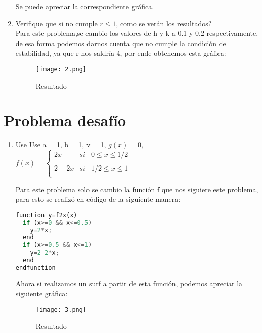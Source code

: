 \documentclass{article}
\begin{document}
\begin{flushleft}
\begin{enumerate}
Se puede apreciar la correspondiente gráfica.

\newpage
\item Verifique que si no cumple $r\leq 1$, como se verán los resultados?\\
 \vspace{0.2 cm}
Para este problema,se cambio los valores de h y k a 0.1 y 0.2 respectivamente, de esa forma podemos darnos cuenta que no cumple la condición de estabilidad, ya que r nos saldría 4, por ende obtenemos esta gráfica:
\begin{figure}[H]
        \centering
         \texttt{[image: 2.png]}
        \caption{Resultado}
\end{figure} 
\end{enumerate}
\vspace{0.3 cm}
\section{Problema desafío}
\begin{enumerate}
    \item Use  Use a = 1, b = 1, v = 1, $g(x) = 0$,\\
  \vspace{0.5 cm}
  $  f(x)= \left\{ \begin{array}{lcc}
             2x &   si  & 0 \leq x \leq 1/2 \\
             \\ 2-2x &  si & 1/2 \leq x \leq 1 \\
            
             \end{array}
   \right.
   $
   \\
  
  \newpage
  
   \vspace{0.5 cm}
   Para este problema solo se cambio la función f que nos siguiere este problema, para esto se realizó en código de la siguiente manera:
   
    \begin{lstlisting}[language=Python,caption=Función f]
function y=f2x(x)
  if (x>=0 && x<=0.5)
    y=2*x;
  end
  if (x>=0.5 && x<=1)
    y=2-2*x;
  end
endfunction

\end{lstlisting}
   
Ahora si realizamos un surf a partir de esta función, podemos apreciar la siguiente gráfica:
\begin{figure}[H]
        \centering
         \texttt{[image: 3.png]}
        \caption{Resultado}
\end{figure} 


\end{enumerate}
\end{flushleft}
\end{document}
